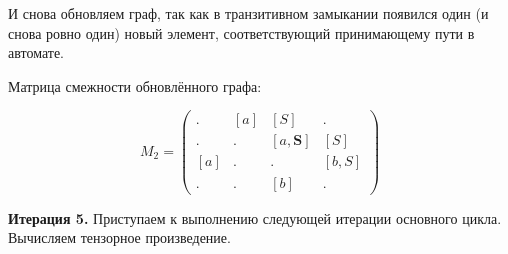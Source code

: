 \begin{example}
И снова обновляем граф, так как в транзитивном замыкании появился один (и снова ровно один) новый элемент, соответствующий принимающему пути в автомате.
\begin{center}
\end{center}
  

Матрица смежности обновлённого графа:

$$ M_2 =
\begin{pmatrix} 
. & [a] & [S] & . \\
. & . & [a, \textbf{S}] & [S] \\
[a] & . & . & [b,S] \\
. & . & [b] & . 
\end{pmatrix}
$$

\textbf{Итерация 5.}
Приступаем к выполнению следующей итерации основного цикла.
Вычисляем тензорное произведение.



\end{example}
